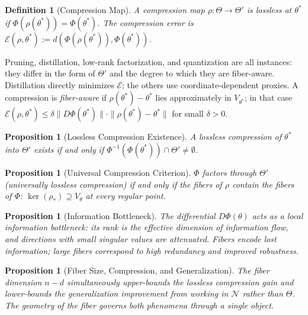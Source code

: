 \documentclass[twocolumn,10pt]{article}
\theoremstyle{thmstyle}
\newtheorem{proposition}[theorem]{Proposition}
\theoremstyle{defstyle}
\newtheorem{definition}[theorem]{Definition}
\begin{document}
\begin{definition}[Compression Map]
A \emph{compression map} $\rho : \Theta \to \Theta'$ is
\emph{lossless at $\theta^*$} if $\Phi(\rho(\theta^*)) = \Phi(\theta^*)$.
The \emph{compression error} is
$\mathcal{E}(\rho,\theta^*) := d(\Phi(\rho(\theta^*)),\Phi(\theta^*))$.
\end{definition}

Pruning, distillation, low-rank factorization, and quantization are
all instances: they differ in the form of $\Theta'$ and the degree to
which they are fiber-aware. Distillation directly minimizes
$\mathcal{E}$; the others use coordinate-dependent proxies. A
compression is \emph{fiber-aware} if $\rho(\theta^*) - \theta^*$ lies
approximately in $V_{\theta^*}$; in that case
$\mathcal{E}(\rho,\theta^*) \leq \delta\|D\Phi(\theta^*)\|\cdot
\|\rho(\theta^*)-\theta^*\|$ for small $\delta > 0$.

\begin{proposition}[Lossless Compression Existence]
A lossless compression of $\theta^*$ into $\Theta'$ exists if and
only if $\Phi^{-1}(\Phi(\theta^*)) \cap \Theta' \neq \emptyset$.
\end{proposition}

\begin{proposition}[Universal Compression Criterion]
$\Phi$ factors through $\Theta'$ (universally lossless compression)
if and only if the fibers of $\rho$ contain the fibers of $\Phi$:
$\ker(\rho_*) \supseteq V_\theta$ at every regular point.
\end{proposition}

\begin{proposition}[Information Bottleneck]
The differential $D\Phi(\theta)$ acts as a local information bottleneck:
its rank is the effective dimension of information flow, and directions
with small singular values are attenuated. Fibers encode lost
information; large fibers correspond to high redundancy and improved
robustness.
\end{proposition}

\begin{proposition}[Fiber Size, Compression, and Generalization]
The fiber dimension $n - d$ simultaneously upper-bounds the lossless
compression gain and lower-bounds the generalization improvement from
working in $\mathcal{N}$ rather than $\Theta$. The geometry of the
fiber governs both phenomena through a single object.
\end{proposition}

\end{document}

